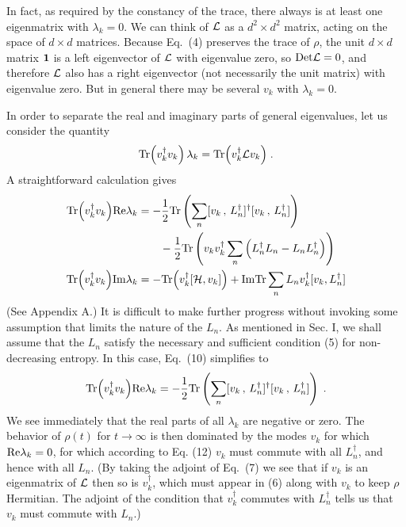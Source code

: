 \documentclass[12pt]{article}
\def\BM#1{\mbox{\boldmath{$#1$}}}
\begin{document}
In fact, as required by the constancy of the trace, there always is at least one eigenmatrix with $\lambda_k=0$.  We can think of ${\cal L}$ as a $d^2\times d^2$ matrix, acting on the space of $d\times d$ matrices.  Because Eq.~(4) preserves the trace of $\rho$, the unit $d\times d$ matrix ${\BM 1}$ is a left eigenvector of ${\cal L}$ with eigenvalue zero, so ${\rm Det}{\cal L}=0$, and therefore ${\cal L}$ also has a right eigenvector (not necessarily the unit matrix) with eigenvalue zero.  But in general there may be several  $v_k$ with $\lambda_k=0$.

In order to separate the real and imaginary parts of general eigenvalues, let us consider the quantity
\begin{equation}
{\rm Tr}\Big(v_k^\dagger v_k\Big)\,\lambda_k= {\rm Tr}\Big(v_k^\dagger {\cal L}v_k\Big)\;.
\end{equation}
A straightforward calculation gives
\begin{align}
{\rm Tr}\Big(v_k^\dagger v_k\Big){\rm Re}\lambda_k &=-\frac{1}{2}{\rm Tr}\left(\sum_n [v_k\,,\,L_n^\dagger]^\dagger[v_k\,,\,L_n^\dagger]\right)\nonumber\\
&\quad\quad-\frac{1}{2}{\rm Tr}\left(v_k v_k^\dagger \sum_n\Big(L_n^\dagger L_n-L_n L_n^\dagger\Big)\right)\\
{\rm Tr}\Big(v_k^\dagger v_k\Big){\rm Im}\lambda_k &=-{\rm Tr}\Big(v_k^\dagger [{\cal H},v_k]\Big)
+{\rm Im}{\rm Tr}\sum_n L_nv_k^\dagger[v_k,L_n^\dagger ]\end{align}
(See Appendix A.)  
It is difficult to make further progress without invoking some assumption that limits the nature of the $L_n$.  As mentioned in Sec. I, we shall assume that the $L_n$ satisfy the necessary and sufficient condition (5) for non-decreasing entropy.  In this case, Eq.~(10) simplifies to 
\begin{equation}
{\rm Tr}\Big(v_k^\dagger v_k\Big){\rm Re}\lambda_k=-\frac{1}{2}{\rm Tr}\left(\sum_n [v_k\,,\,L_n^\dagger]^\dagger[v_k\,,\,L_n^\dagger]\right)\;.
\end{equation}
We see immediately that  the real parts of all $\lambda_k$ are negative or zero.  The behavior of $\rho(t)$ for $t\rightarrow\infty$ is then dominated by the modes $v_k$ for which ${\rm Re}\lambda_k=0$, for which according to Eq. (12) $v_k$ must commute with all $L^\dagger_n$, and hence with all $L_n$.  (By taking the adjoint of Eq.~(7) we see that if $v_k$ is an eigenmatrix of ${\cal L}$ then so is $v_k^\dagger$, which must appear in (6) along with $v_k$ to keep $\rho$ Hermitian.  The adjoint of the condition that $v_k^\dagger$ commutes with $L_n^\dagger$ tells us that $v_k$ must commute with $L_n$.)  
\end{document}
